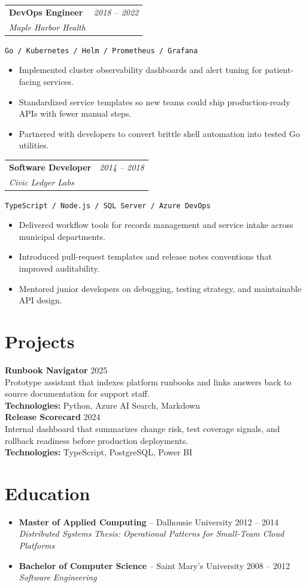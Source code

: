 \documentclass[10pt]{article}
\makeatletter
\newcommand{\tech}[1]{\textcolor{secondary}{\textbf{#1}}}
\newcommand{\experience}[4]{%
  \vspace{4pt}
  \begin{tabular*}{\textwidth}{@{}l@{\extracolsep{\fill}}r@{}}
    \textbf{#1} & \textit{#2} \\
    \textit{\small#3} & \textit{\small#4}
  \end{tabular*}
  \vspace{-4pt}
}
\makeatother
\begin{document}
\experience{DevOps Engineer}{2018 -- 2022}{Maple Harbor Health}{}
\hspace{0.5cm}\texttt{Go / Kubernetes / Helm / Prometheus / Grafana}
\begin{itemize}
    \item Implemented cluster observability dashboards and alert tuning for patient-facing services.
    \item Standardized service templates so new teams could ship production-ready APIs with fewer manual steps.
    \item Partnered with developers to convert brittle shell automation into tested Go utilities.
\end{itemize}

\experience{Software Developer}{2014 -- 2018}{Civic Ledger Labs}{}
\hspace{0.5cm}\texttt{TypeScript / Node.js / SQL Server / Azure DevOps}
\begin{itemize}
    \item Delivered workflow tools for records management and service intake across municipal departments.
    \item Introduced pull-request templates and release notes conventions that improved auditability.
    \item Mentored junior developers on debugging, testing strategy, and maintainable API design.
\end{itemize}

\section*{Projects}
\textbf{Runbook Navigator} \hfill 2025 \\
Prototype assistant that indexes platform runbooks and links answers back to source documentation for support staff. \\
\textcolor{secondary}{\textbf{Technologies:}} Python, Azure AI Search, Markdown \\

\textbf{Release Scorecard} \hfill 2024 \\
Internal dashboard that summarizes change risk, test coverage signals, and rollback readiness before production deployments. \\
\textcolor{secondary}{\textbf{Technologies:}} TypeScript, PostgreSQL, Power BI \\

\section*{Education}
\begin{itemize}
    \item \tech{Master of Applied Computing} -- Dalhousie University \hfill 2012 -- 2014
    \textit{\small Distributed Systems}
    \textit{\small Thesis: Operational Patterns for Small-Team Cloud Platforms}
    \item \tech{Bachelor of Computer Science} -- Saint Mary's University \hfill 2008 -- 2012
    \textit{\small Software Engineering}
\end{itemize}
\end{document}
